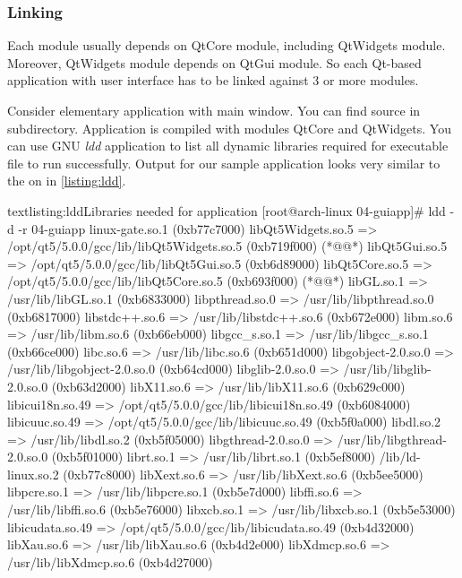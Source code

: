 \subsubsection{Linking}
Each module usually depends on QtCore module, including QtWidgets module. Moreover, QtWidgets module depends on QtGui module. So each Qt-based application with user interface has to be linked against 3 or more modules.

Consider elementary  application with main window. You can find source in subdirectory. Application is compiled with modules QtCore and QtWidgets. You can use GNU \textit{ldd} application to list all dynamic libraries required for executable file to run successfully. Output for our sample application looks very similar to the on in \autoref{listing:ldd}.

\begin{fdoccode}{text}{listing:ldd}{Libraries needed for  application}
[root@arch-linux 04-guiapp]# ldd -d -r 04-guiapp
linux-gate.so.1 (0xb77c7000)
libQt5Widgets.so.5 => /opt/qt5/5.0.0/gcc/lib/libQt5Widgets.so.5 (0xb719f000) (*@\label{listing:qt5w}@*)
libQt5Gui.so.5 => /opt/qt5/5.0.0/gcc/lib/libQt5Gui.so.5 (0xb6d89000)
libQt5Core.so.5 => /opt/qt5/5.0.0/gcc/lib/libQt5Core.so.5 (0xb693f000) (*@\label{listing:qt5c}@*)
libGL.so.1 => /usr/lib/libGL.so.1 (0xb6833000)
libpthread.so.0 => /usr/lib/libpthread.so.0 (0xb6817000)
libstdc++.so.6 => /usr/lib/libstdc++.so.6 (0xb672e000)
libm.so.6 => /usr/lib/libm.so.6 (0xb66eb000)
libgcc_s.so.1 => /usr/lib/libgcc_s.so.1 (0xb66ce000)
libc.so.6 => /usr/lib/libc.so.6 (0xb651d000)
libgobject-2.0.so.0 => /usr/lib/libgobject-2.0.so.0 (0xb64cd000)
libglib-2.0.so.0 => /usr/lib/libglib-2.0.so.0 (0xb63d2000)
libX11.so.6 => /usr/lib/libX11.so.6 (0xb629c000)
libicui18n.so.49 => /opt/qt5/5.0.0/gcc/lib/libicui18n.so.49 (0xb6084000)
libicuuc.so.49 => /opt/qt5/5.0.0/gcc/lib/libicuuc.so.49 (0xb5f0a000)
libdl.so.2 => /usr/lib/libdl.so.2 (0xb5f05000)
libgthread-2.0.so.0 => /usr/lib/libgthread-2.0.so.0 (0xb5f01000)
librt.so.1 => /usr/lib/librt.so.1 (0xb5ef8000)
/lib/ld-linux.so.2 (0xb77c8000)
libXext.so.6 => /usr/lib/libXext.so.6 (0xb5ee5000)
libpcre.so.1 => /usr/lib/libpcre.so.1 (0xb5e7d000)
libffi.so.6 => /usr/lib/libffi.so.6 (0xb5e76000)
libxcb.so.1 => /usr/lib/libxcb.so.1 (0xb5e53000)
libicudata.so.49 => /opt/qt5/5.0.0/gcc/lib/libicudata.so.49 (0xb4d32000)
libXau.so.6 => /usr/lib/libXau.so.6 (0xb4d2e000)
libXdmcp.so.6 => /usr/lib/libXdmcp.so.6 (0xb4d27000)
\end{fdoccode}

